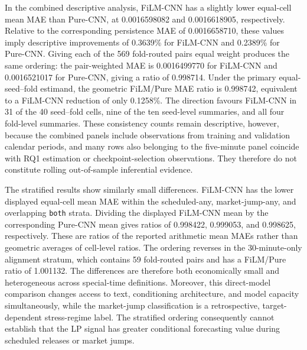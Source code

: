 In the combined descriptive analysis, FiLM-CNN has a slightly lower
equal-cell mean MAE than Pure-CNN, at 0.0016598082 and 0.0016618905,
respectively.  Relative to the corresponding persistence MAE of 0.0016658710,
these values imply descriptive improvements of 0.3639\% for FiLM-CNN and
0.2389\% for Pure-CNN.  Giving each of the 569 fold-routed pairs equal weight
produces the same ordering: the pair-weighted MAE is 0.0016499770 for
FiLM-CNN and 0.0016521017 for Pure-CNN, giving a ratio of 0.998714.  Under the
primary equal-seed--fold estimand, the geometric FiLM/Pure MAE ratio is
0.998742, equivalent to a FiLM-CNN reduction of only 0.1258\%.  The direction
favours FiLM-CNN in 31 of the 40 seed--fold cells, nine of the ten seed-level
summaries, and all four fold-level summaries.  These consistency counts remain
descriptive, however, because the combined panels include observations from
training and validation calendar periods, and many rows also belonging to the
five-minute panel coincide with RQ1 estimation or checkpoint-selection
observations.  They therefore do not constitute rolling out-of-sample
inferential evidence.


The stratified results show similarly small differences.  FiLM-CNN has the
lower displayed equal-cell mean MAE within the scheduled-any,
market-jump-any, and overlapping \texttt{both} strata.  Dividing the displayed
FiLM-CNN mean by the corresponding Pure-CNN mean gives ratios of 0.998422,
0.999053, and 0.998625, respectively.  These are ratios of the reported
arithmetic mean MAEs rather than geometric averages of cell-level ratios.  The
ordering reverses in the 30-minute-only alignment stratum, which contains 59
fold-routed pairs and has a FiLM/Pure ratio of 1.001132.  The differences are
therefore both economically small and heterogeneous across special-time
definitions.  Moreover, this direct-model comparison changes access to text,
conditioning architecture, and model capacity simultaneously, while the
market-jump classification is a retrospective, target-dependent stress-regime
label.  The stratified ordering consequently cannot establish that the LP
signal has greater conditional forecasting value during scheduled releases or
market jumps.



